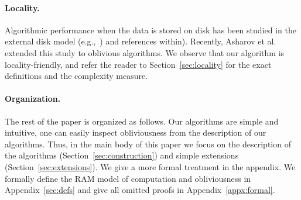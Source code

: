 \paragraph{Locality.} Algorithmic performance when the data is stored on disk has been studied in the external disk model (e.g.,~\cite{RuemmlerW94,ArgeFGV97,Vitter01,Vitter06}) and references within). Recently, Asharov et al.~\cite{AsharovCNPRS19} extended this study to oblivious algorithms.  We observe that our algorithm is locality-friendly, and refer the reader to Section~\ref{sec:locality} for the exact definitions and the complexity measure.


\paragraph{Organization.}
The rest of the paper is organized as follows. Our algorithms are simple and intuitive, one can easily inspect obliviousness from the description of our algorithms. Thus, in the main body of this paper we focus on the description of the algorithms (Section~\ref{sec:construction}) and simple extensions (Section~\ref{sec:extensions}).
We give a more formal treatment in the appendix. 
We formally define the RAM model of computation and obliviousness in Appendix~\ref{sec:defs} and give all omitted proofs in Appendix~\ref{appx:formal}.  

%
%
%
%
%


